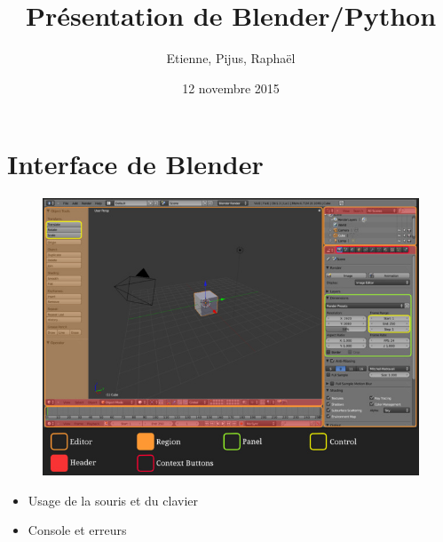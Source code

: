 \documentclass[11pt,usenames,dvipsnames]{beamer}
\author{Etienne, Pijus, Raphaël}
\title{Présentation de Blender/Python}
\date{12 novembre 2015}
\begin{document}
\frame{\titlepage}


\begin{frame}
\tableofcontents[
  currentsection,
  sectionstyle=show/show,
  subsectionstyle=hide/hide]
\end{frame}


\section{Interface de Blender}

\begin{frame}
  \begin{figure}
    \includegraphics[scale=0.5]{blender-ui1.jpg}
  \end{figure}
\end{frame}

\begin{frame}
  \begin{itemize}
  \item Usage de la souris et du clavier
  \item Console et erreurs
  \end{itemize}
    
\end{frame}
\end{document}
